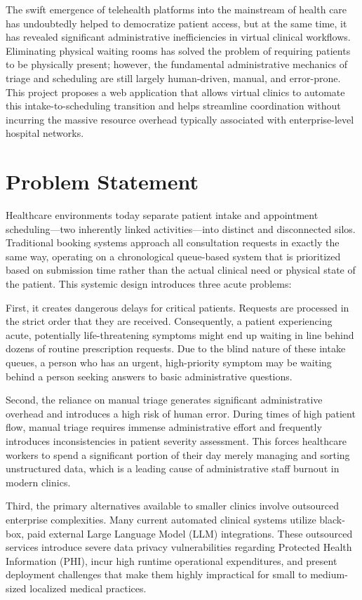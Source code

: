 \documentclass[12pt,a4paper]{report}
\begin{document}
The swift emergence of telehealth platforms into the mainstream of health care has undoubtedly helped to democratize patient access, but at the same time, it has revealed significant administrative inefficiencies in virtual clinical workflows. Eliminating physical waiting rooms has solved the problem of requiring patients to be physically present; however, the fundamental administrative mechanics of triage and scheduling are still largely human-driven, manual, and error-prone. This project proposes a web application that allows virtual clinics to automate this intake-to-scheduling transition and helps streamline coordination without incurring the massive resource overhead typically associated with enterprise-level hospital networks.

\section{Problem Statement}
Healthcare environments today separate patient intake and appointment scheduling—two inherently linked activities—into distinct and disconnected silos. Traditional booking systems approach all consultation requests in exactly the same way, operating on a chronological queue-based system that is prioritized based on submission time rather than the actual clinical need or physical state of the patient. This systemic design introduces three acute problems:

First, it creates dangerous delays for critical patients. Requests are processed in the strict order that they are received. Consequently, a patient experiencing acute, potentially life-threatening symptoms might end up waiting in line behind dozens of routine prescription requests. Due to the blind nature of these intake queues, a person who has an urgent, high-priority symptom may be waiting behind a person seeking answers to basic administrative questions.

Second, the reliance on manual triage generates significant administrative overhead and introduces a high risk of human error. During times of high patient flow, manual triage requires immense administrative effort and frequently introduces inconsistencies in patient severity assessment. This forces healthcare workers to spend a significant portion of their day merely managing and sorting unstructured data, which is a leading cause of administrative staff burnout in modern clinics.

Third, the primary alternatives available to smaller clinics involve outsourced enterprise complexities. Many current automated clinical systems utilize black-box, paid external Large Language Model (LLM) integrations. These outsourced services introduce severe data privacy vulnerabilities regarding Protected Health Information (PHI), incur high runtime operational expenditures, and present deployment challenges that make them highly impractical for small to medium-sized localized medical practices.
\end{document}
